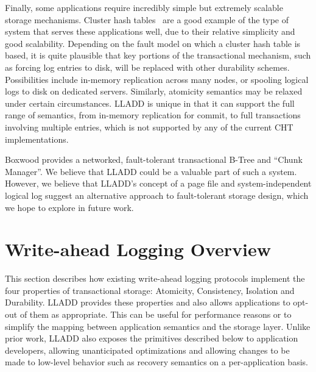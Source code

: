 \documentclass[10pt,letterpaper,twocolumn,english]{article}
\newcommand{\yad}{LLADD\xspace}
\newcommand{\eab}[1]{\textcolor{red}{\bf EAB: #1}}
\newcommand{\rcs}[1]{\textcolor{green}{\bf RCS: #1}}
\begin{document}
Finally, some applications require incredibly simple but extremely
scalable storage mechanisms.  Cluster hash tables~\cite{cht} are a
good example of the type of system that serves these applications
well, due to their relative simplicity and good scalability.
Depending on the fault model on which a cluster hash table is based,
it is quite plausible that key portions of the transactional
mechanism, such as forcing log entries to disk, will be replaced with
other durability schemes.  Possibilities include in-memory replication
across many nodes, or spooling logical logs to disk on dedicated
servers.  Similarly, atomicity semantics may be relaxed under certain
circumstances.  \yad is unique in that it can support the full range
of semantics, from in-memory replication for commit, to full
transactions involving multiple entries, which is not supported by any
of the current CHT implementations.


Boxwood\cite{boxwood} provides a networked, fault-tolerant transactional B-Tree and
``Chunk Manager''.  We believe that \yad could be a valuable part of
such a system.  However, we believe that \yad's concept of a page file
and system-independent logical log suggest an alternative approach to
fault-tolerant storage design, which we hope to explore in future
work.






\section{Write-ahead Logging Overview}

This section describes how existing write-ahead logging protocols
implement the four properties of transactional storage: Atomicity,
Consistency, Isolation and Durability.  \yad provides these
properties and also allows applications to opt-out of
them as appropriate.  This can be useful for
performance reasons or to simplify the mapping between application
semantics and the storage layer.  Unlike prior work, \yad also exposes
the primitives described below to application developers, allowing
unanticipated optimizations and allowing changes to be made to low-level
behavior such as recovery semantics on a per-application basis.
\end{document}
